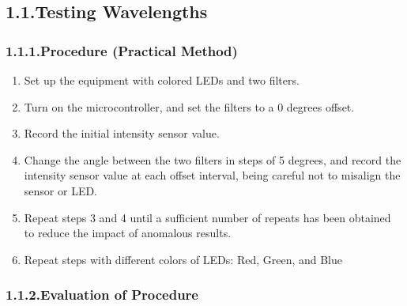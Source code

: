 \documentclass{article}
\begin{document}
\subsection{1.1.\hspace*{0.5em}Testing Wavelengths}\label{sec-testing-wavelengths}%

\subsubsection{1.1.1.\hspace*{0.5em}Procedure (Practical Method)}\label{sec-procedure-practical-method}%

\begin{enumerate}[noitemsep,topsep=\mdcompacttopsep]%

\item{}Set up the equipment with colored LEDs and two filters.%

\item{}Turn on the microcontroller, and set the filters to a 0 degrees offset.%

\item{}Record the initial intensity sensor value.%

\item{}Change the angle between the two filters in steps of 5 degrees, and record the intensity sensor value at each offset interval, being careful not to misalign the sensor or LED.%

\item{}Repeat steps 3 and 4 until a sufficient number of repeats has been obtained to reduce the impact of anomalous results.%

\item{}Repeat steps with different colors of LEDs: Red, Green, and Blue%
\end{enumerate}%

\subsubsection{1.1.2.\hspace*{0.5em}Evaluation of Procedure}\label{sec-evaluation-of-procedure}%
\end{document}
